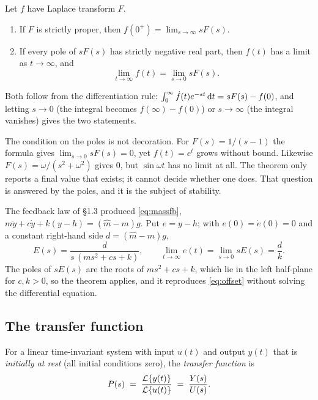 \documentclass[11pt]{article}
\begin{document}
\begin{proposition}\label{prop:fvt}
Let $f$ have Laplace transform $F$.
\begin{enumerate}[label=(\roman*),itemsep=2pt]
\item If $F$ is strictly proper, then $f(0^{+}) = \lim_{s\to\infty} sF(s)$.
\item If every pole of $sF(s)$ has strictly negative real part, then
$f(t)$ has a limit as $t\to\infty$, and
\[
   \lim_{t\to\infty} f(t) = \lim_{s\to 0} sF(s).
\]
\end{enumerate}
\end{proposition}

Both follow from the differentiation rule: $\int_{0}^{\infty}\dot f(t)e^{-st}\,\mathrm{d} t
= sF(s)-f(0)$, and letting $s\to0$ (the integral becomes $f(\infty)-f(0)$) or
$s\to\infty$ (the integral vanishes) gives the two statements.

\begin{caution}
The condition on the poles is not decoration. For $F(s)=1/(s-1)$ the formula
gives $\lim_{s\to0}sF(s)=0$, yet $f(t)=e^{t}$ grows without bound. Likewise
$F(s)=\omega/(s^{2}+\omega^{2})$ gives $0$, but $\sin\omega t$ has no limit at
all. The theorem only reports a final value that exists; it cannot decide
whether one does. That question is answered by the poles, and it is the
subject of stability.
\end{caution}

\begin{example}
The feedback law of \S1.3 produced \eqref{eq:massfb},
$m\ddot y+c\dot y+k(y-h)=(\hat m-m)g$. Put $e=y-h$; with $e(0)=\dot e(0)=0$ and a
constant right-hand side $d=(\hat m-m)g$,
\[
   E(s) = \frac{d}{s\,(ms^{2}+cs+k)} ,
   \qquad
   \lim_{t\to\infty} e(t) = \lim_{s\to0} sE(s) = \frac{d}{k} .
\]
The poles of $sE(s)$ are the roots of $ms^{2}+cs+k$, which lie in the left
half-plane for $c,k>0$, so the theorem applies, and it reproduces
\eqref{eq:offset} without solving the differential equation.
\end{example}

\subsection{The transfer function}
\begin{definition}\label{def:tf}
For a linear time-invariant system with input $u(t)$ and output $y(t)$ that is
\emph{initially at rest} (all initial conditions zero), the \emph{transfer
function} is
\[
   P(s) \;=\; \frac{\mathcal{L}\{y(t)\}}{\mathcal{L}\{u(t)\}} \;=\; \frac{Y(s)}{U(s)} .
\]
\end{definition}
\end{document}
